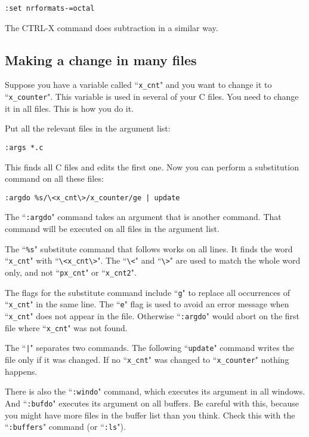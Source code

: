 \begin{Verbatim}[samepage=true]
 :set nrformats-=octal
\end{Verbatim}

The CTRL-X command does subtraction in a similar way.
\subsection{Making a change in many files}
Suppose you have a variable called ``\texttt{x\_cnt}" and you want to change it to ``\texttt{x\_counter}".
This variable is used in several of your C files.
You need to change it in all files.
This is how you do it.

Put all the relevant files in the argument list:

\begin{Verbatim}[samepage=true]
 :args *.c
\end{Verbatim}
 
This finds all C files and edits the first one.
Now you can perform a substitution command on all these files:

\begin{Verbatim}[samepage=true]
 :argdo %s/\<x_cnt\>/x_counter/ge | update
\end{Verbatim}

The ``\texttt{:argdo}" command takes an argument that is another command.
That command will be executed on all files in the argument list.

The ``\texttt{\%s}" substitute command that follows works on all lines.
It finds the word ``\texttt{x\_cnt}" with ``\texttt{\textbackslash<x\_cnt\textbackslash>}".
The ``\texttt{\textbackslash<}" and ``\texttt{\textbackslash>}" are used to match the whole word only, and not ``\texttt{px\_cnt}" or ``\texttt{x\_cnt2}".

The flags for the substitute command include ``\texttt{g}" to replace all occurrences of ``\texttt{x\_cnt}" in the same line.
The ``\texttt{e}" flag is used to avoid an error message when ``\texttt{x\_cnt}" does not appear in the file.
Otherwise ``\texttt{:argdo}" would abort on the first file where ``\texttt{x\_cnt}" was not found.

The ``\texttt{|}" separates two commands.
The following ``\texttt{update}" command writes the file only if it was changed.
If no ``\texttt{x\_cnt}" was changed to ``\texttt{x\_counter}" nothing happens.

There is also the ``\texttt{:windo}" command, which executes its argument in all windows.
And ``\texttt{:bufdo}" executes its argument on all buffers.
Be careful with this, because you might have more files in the buffer list than you think.
Check this with the ``\texttt{:buffers}" command (or ``\texttt{:ls}").
